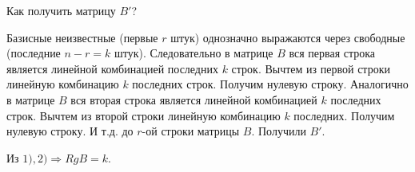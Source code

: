 Как получить матрицу $B'$?

Базисные неизвестные (первые $r$ штук) однозначно выражаются через свободные (последние $n-r = k$ штук). Следовательно в матрице $B$ вся первая строка является линейной комбинацией последних $k$ строк. Вычтем из первой строки линейную комбинацию $k$ последних строк. Получим нулевую строку. Аналогично в матрице $B$ вся вторая строка является линейной комбинацией $k$ последних строк. Вычтем из второй строки линейную комбинацию $k$ последних. Получим нулевую строку. И т.д. до $r$-ой строки матрицы $B$. Получили $B'$.

Из $1), 2) \Rightarrow RgB =k.$

\ep
\newpage
\let\clearpage\relax

